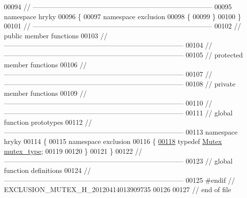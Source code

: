 \begin{DoxyCode}
00094 \textcolor{comment}{//
      ------------------------------------------------------------------------------}
00095 \textcolor{keyword}{namespace }hryky
00096 \{
00097 \textcolor{keyword}{namespace }exclusion
00098 \{
00099 \}
00100 \}
00101 \textcolor{comment}{//
      ------------------------------------------------------------------------------}
00102 \textcolor{comment}{// public member functions}
00103 \textcolor{comment}{//
      ------------------------------------------------------------------------------}
00104 \textcolor{comment}{//
      ------------------------------------------------------------------------------}
00105 \textcolor{comment}{// protected member functions}
00106 \textcolor{comment}{//
      ------------------------------------------------------------------------------}
00107 \textcolor{comment}{//
      ------------------------------------------------------------------------------}
00108 \textcolor{comment}{// private member functions}
00109 \textcolor{comment}{//
      ------------------------------------------------------------------------------}
00110 \textcolor{comment}{//
      ------------------------------------------------------------------------------}
00111 \textcolor{comment}{// global function prototypes}
00112 \textcolor{comment}{//
      ------------------------------------------------------------------------------}
00113 \textcolor{keyword}{namespace }hryky
00114 \{
00115 \textcolor{keyword}{namespace }exclusion
00116 \{
\hypertarget{exclusion__mutex_8h_source_l00118}{}\hyperlink{namespacehryky_1_1exclusion_af3f8d05b34064ca5b0e15ed01d1546c2}{00118}     \textcolor{keyword}{typedef} \hyperlink{classhryky_1_1exclusion_1_1_mutex}{Mutex}                       \hyperlink{namespacehryky_1_1exclusion_af3f8d05b34064ca5b0e15ed01d1546c2}{mutex_type};
00119 
00120 \}
00121 \}
00122 \textcolor{comment}{//
      ------------------------------------------------------------------------------}
00123 \textcolor{comment}{// global function definitions}
00124 \textcolor{comment}{//
      ------------------------------------------------------------------------------}
00125 \textcolor{preprocessor}{#endif // EXCLUSION\_MUTEX\_H\_20120414013909735}
00126 \textcolor{preprocessor}{}
00127 \textcolor{comment}{// end of file}
\end{DoxyCode}
